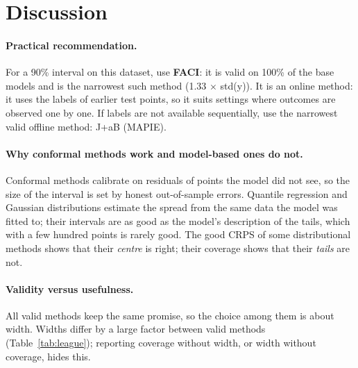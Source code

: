 \documentclass[11pt]{article}
\begin{document}
\FloatBarrier
\section{Discussion}\label{sec:discussion}
\paragraph{Practical recommendation.} For a 90\% interval on this dataset, use \textbf{FACI}: it is valid on 100\% of the base models and is the narrowest such method (1.33 $\times$ std(y)). It is an online method: it uses the labels of earlier test points, so it suits settings where outcomes are observed one by one. If labels are not available sequentially, use the narrowest valid offline method: J+aB (MAPIE).
\paragraph{Why conformal methods work and model-based ones do not.} Conformal methods calibrate on residuals of points the model did not
see, so the size of the interval is set by honest out-of-sample errors. Quantile regression and Gaussian distributions estimate the spread
from the same data the model was fitted to; their intervals are as good as the model's description of the tails, which with a few hundred
points is rarely good. The good CRPS of some distributional methods shows that their \emph{centre} is right; their coverage shows that their
\emph{tails} are not.
\paragraph{Validity versus usefulness.} All valid methods keep the same promise, so the choice among them is about width. Widths differ by
a large factor between valid methods (Table~\ref{tab:league}); reporting coverage without width, or width without coverage, hides this.
\end{document}
